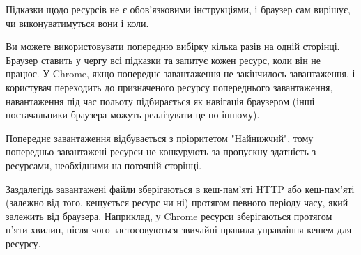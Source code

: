 Підказки щодо ресурсів не є обов’язковими інструкціями, і браузер сам вирішує, чи виконуватимуться вони і коли.

Ви можете використовувати попередню вибірку кілька разів на одній сторінці.
Браузер ставить у чергу всі підказки та запитує кожен ресурс, коли він не працює.
У Chrome, якщо попереднє завантаження не закінчилось завантаження,
і користувач переходить до призначеного ресурсу попереднього завантаження,
навантаження під час польоту підбирається як навігація браузером
(інші постачальники браузера можуть реалізувати це по-іншому).

Попереднє завантаження відбувається з пріоритетом "Найнижчий",
тому попередньо завантажені ресурси не конкурують за пропускну здатність з ресурсами,
необхідними на поточній сторінці.

Заздалегідь завантажені файли зберігаються в кеш-пам'яті HTTP або кеш-пам'яті
(залежно від того, кешується ресурс чи ні) протягом певного періоду часу,
який залежить від браузера. Наприклад, у Chrome ресурси зберігаються протягом п’яти хвилин,
після чого застосовуються звичайні правила управління кешем для ресурсу.
